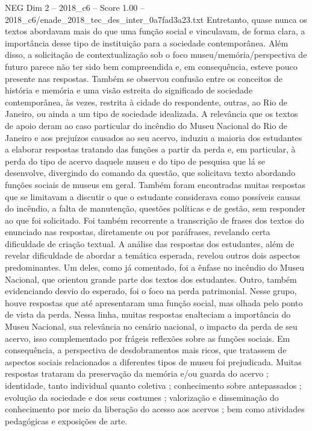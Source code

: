 \begin{textsample}{NEG Dim 2 – 2018\_c6 – Score 1.00 – 2018\_c6/enade\_2018\_tec\_des\_inter\_0a7fad3a23.txt}
Entretanto, quase nunca os textos abordavam mais do que uma função social e vinculavam, de forma clara, a importância desse tipo de instituição para a sociedade contemporânea.
Além disso, a solicitação de contextualização sob o foco museu/memória/perspectiva de futuro parece não ter sido bem compreendida e, em consequência, esteve pouco presente nas respostas.
Também se observou confusão entre os conceitos de história e memória e uma visão estreita do significado de sociedade contemporânea, às vezes, restrita à cidade do respondente, outras, ao Rio de Janeiro, ou ainda a um tipo de sociedade idealizada.
A relevância que os textos de apoio deram ao caso particular do incêndio do Museu Nacional do Rio de Janeiro e aos prejuízos causados ao seu acervo, induziu a maioria dos estudantes a elaborar respostas tratando das funções a partir da perda e, em particular, à perda do tipo de acervo daquele museu e do tipo de pesquisa que lá se desenvolve, divergindo do comando da questão, que solicitava texto abordando funções sociais de museus em geral.
Também foram encontradas muitas respostas que se limitavam a discutir o que o estudante considerava como possíveis causas do incêndio, a falta de manutenção, questões políticas e de gestão, sem responder ao que foi solicitado.
Foi também recorrente a transcrição de frases dos textos do enunciado nas respostas, diretamente ou por paráfrases, revelando certa dificuldade de criação textual.
A análise das respostas dos estudantes, além de revelar dificuldade de abordar a temática esperada, revelou outros dois aspectos predominantes.
Um deles, como já comentado, foi a ênfase no incêndio do Museu Nacional, que orientou grande parte dos textos dos estudantes.
Outro, também evidenciando desvio do esperado, foi o foco na perda patrimonial.
Nesse grupo, houve respostas que até apresentaram uma função social, mas olhada pelo ponto de vista da perda.
Nessa linha, muitas respostas enalteciam a importância do Museu Nacional, sua relevância no cenário nacional, o impacto da perda de seu acervo, isso complementado por frágeis reflexões sobre as funções sociais.
Em consequência, a perspectiva de desdobramentos mais ricos, que tratassem de aspectos sociais relacionados a diferentes tipos de museu foi prejudicada.
Muitas respostas trataram da preservação da memória e/ou guarda do acervo ; identidade, tanto individual quanto coletiva ; conhecimento sobre antepassados ; evolução da sociedade e dos seus costumes ; valorização e disseminação do conhecimento por meio da liberação do acesso aos acervos ; bem como atividades pedagógicas e exposições de arte.

\end{textsample}
